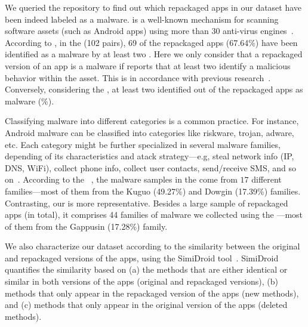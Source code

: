 We queried the \vt repository to find out which repackaged apps in our
dataset have been indeed labeled as a malware. \vt is a well-known mechanism for
scanning software assets (such as Android apps) using more than 30 anti-virus engines~\cite{DBLP:journals/ese/KhanmohammadiEH19}.
According to \vt, in the \sds (102 pairs),
69 of the repackaged apps (67.64\%) have been identified as a malware by at least two
\ses. Here we only consider that a repackaged version of an app is a malware if \vt reports that at least
two \ses identify a malicious behavior within the asset. This is in accordance with previous research~\cite{vt-label,DBLP:journals/ese/KhanmohammadiEH19}. Conversely, considering the \cds, at least two \se identified \malwares out of the \apps repackaged apps as malware (\malwaresP\%).

Classifying malware into different categories is a common practice. For instance, Android malware can be classified into categories
like riskware, trojan, adware, etc. Each category might be further specialized in several malware families, depending of its
characteristics and atack strategy---e.g, steal network info (IP, DNS, WiFi), collect phone info,
collect user contacts, send/receive SMS, and so on~\cite{DBLP:conf/iccns/RahaliLKTGM20}.
According to the
\avt~\cite{avclass2-paper}, the malware samples in the \sds come from $17$ different families---most of them from the Kuguo (49.27\%) and Dowgin (17.39\%) families.
Contrasting, our \cds is more representative. Besides a large sample of repackaged apps (\apps in total), it
comprises 44 families of malware we collected using the \avt---most
of them from the Gappusin (17.28\%) family.

We also characterize our dataset according to the similarity
between the original and repackaged versions of the apps, using the  
SimiDroid tool~\cite{DBLP:conf/trustcom/0029BK17}. SimiDroid quantifies the similarity
based on (a) the methods that are either identical or similar in both versions of the apps (original and repackaged versions),
(b) methods that only appear in the repackaged version of the apps (new methods), and (c) methods that only appear in the
original version of the apps (deleted methods).

